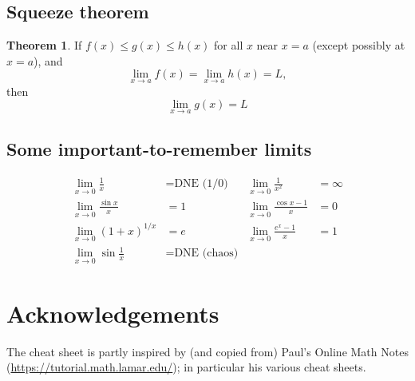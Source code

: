 \documentclass[10pt]{extarticle}
\theoremstyle{definition}
\newtheorem*{theorem}{Theorem}
\begin{document}
\begin{multicols}{2}
		\subsection*{Squeeze theorem}
		\begin{theorem}
		If \(f(x) \leq g(x) \leq h(x)\) for all \(x\) near \(x = a\) (except possibly at \(x = a\)), and
		\[\lim_{x \to a}{f(x)} = \lim_{x \to a}{h(x)} = L,\] then \[\lim_{x \to a}{g(x)} = L\]
		\end{theorem}

		\subsection*{Some important-to-remember limits}
		\begin{align*}  %
			\lim_{x \to 0} \frac{1}{x} &= \text{DNE (1/0)} & \lim_{x \to 0} \frac{1}{x^2} &= \infty \\
			\lim_{x \to 0} \frac{\sin{x}}{x} &= 1 & \lim_{x \to 0} \frac{\cos{x} - 1}{x} &= 0 \\
			\lim_{x \to 0} (1 + x)^{1/x} &= e & \lim_{x \to 0} \frac{e^x - 1}{x} &= 1 \\
			\lim_{x \to 0} \sin{\frac{1}{x}} &= \text{DNE (chaos)}
		\end{align*}
	\end{multicols}
	\pagebreak

	\section{Acknowledgements}
	The cheat sheet is partly inspired by (and copied from) Paul's Online Math Notes (\url{https://tutorial.math.lamar.edu/}); in particular his various cheat sheets.
\end{document}
